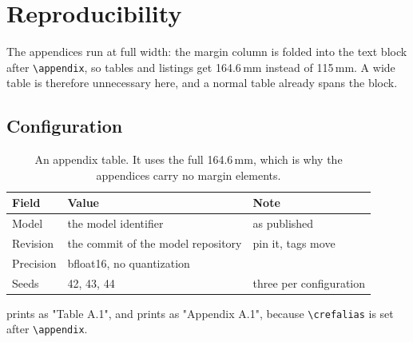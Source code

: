 
\chapter{Reproducibility}
\label{app:first}

The appendices run at full width: the margin column is folded into the text block
after \verb|\appendix|, so tables and listings get 164.6\,mm instead of 115\,mm.
A wide table is therefore unnecessary here, and a normal table already spans the block.

\section{Configuration}
\label{app:first-config}

\begin{table}[htbp]
  \centering
  \small
  \caption[A full-width appendix table]{An appendix table. It uses the full 164.6\,mm, which is why the appendices carry no margin elements.}
  \label{tab:app-config}
  \begin{tabular}{@{}l p{6cm} p{5cm}@{}}
    \toprule
    Field & Value & Note \\
    \midrule
    Model & the model identifier & as published \\
    Revision & the commit of the model repository & pin it, tags move \\
    Precision & bfloat16, no quantization & \\
    Seeds & 42, 43, 44 & three per configuration \\
    \bottomrule
  \end{tabular}
\end{table}

 prints as "Table A.1", and  prints as "Appendix A.1", because \verb|\crefalias| is set after \verb|\appendix|.
